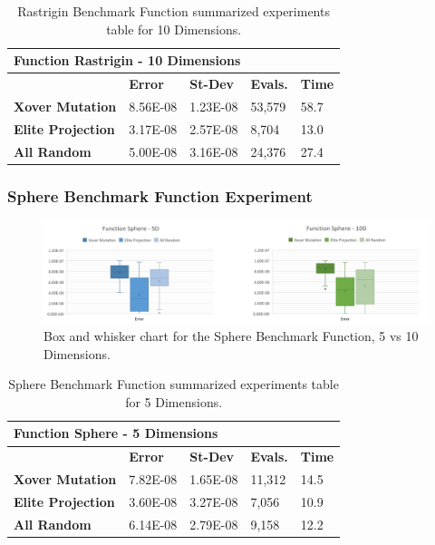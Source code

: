 \documentclass[graybox]{svmult}
\begin{document}
\begin{table}[]
    \scriptsize
    \centering
    \caption{Rastrigin Benchmark Function summarized experiments table for 10 Dimensions.}\label{tab.fun_rastrigin10}
    \begin{tabular}{@{}lllll@{}}
    \toprule
    \multicolumn{5}{l}{\textbf{Function Rastrigin - 10   Dimensions}} \\ \midrule
     & \textbf{Error} & \textbf{St-Dev} & \textbf{Evals.} & \textbf{Time} \\
    \textbf{Xover Mutation} & 8.56E-08 & 1.23E-08 & 53,579 & 58.7 \\
    \textbf{Elite Projection} & 3.17E-08 & 2.57E-08 & 8,704 & 13.0 \\
    \textbf{All Random} & 5.00E-08 & 3.16E-08 & 24,376 & 27.4 \\ \bottomrule
    \end{tabular}
    \end{table}


\subsubsection{Sphere Benchmark Function Experiment}

\begin{figure}
    \includegraphics[width=\textwidth]{img/fig_fun_sphere.pdf}
    \caption{Box and whisker chart for the Sphere Benchmark Function, 5 vs 10 Dimensions.} \label{fig.fun_sphere}
    \end{figure}

\begin{table}[]
    \scriptsize
    \centering
    \caption{Sphere Benchmark Function summarized experiments table for 5 Dimensions.}\label{tab.fun_sphere5}
    \begin{tabular}{@{}lllll@{}}
    \toprule
    \multicolumn{5}{l}{\textbf{Function Sphere - 5 Dimensions}} \\ \midrule
     & \textbf{Error} & \textbf{St-Dev} & \textbf{Evals.} & \textbf{Time} \\
    \textbf{Xover Mutation} & 7.82E-08 & 1.65E-08 & 11,312 & 14.5 \\
    \textbf{Elite Projection} & 3.60E-08 & 3.27E-08 & 7,056 & 10.9 \\
    \textbf{All Random} & 6.14E-08 & 2.79E-08 & 9,158 & 12.2 \\ \bottomrule
    \end{tabular}
    \end{table}
\end{document}
